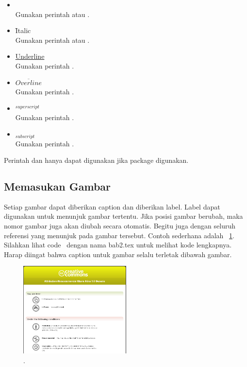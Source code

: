 \begin{itemize}
	\item {} \\
	Gunakan perintah  atau
	.
	\item \f{Italic} \\
	Gunakan perintah  atau
	.
	\item \underline{Underline} \\
	Gunakan perintah .
	\item $\overline{Overline}$ \\
	Gunakan perintah .
	\item $^{superscript}$ \\
	Gunakan perintah \code{\bslash{}$\lbrace\rbrace$}.
	\item $_{subscript}$ \\
	Gunakan perintah \code{\bslash{}\_$\lbrace\rbrace$}.
\end{itemize}

Perintah  dan  hanya dapat digunakan jika
package  digunakan.


\subsection{Memasukan Gambar}
Setiap gambar dapat diberikan caption dan diberikan label. Label dapat
digunakan untuk menunjuk gambar tertentu. Jika posisi gambar berubah, maka
nomor gambar juga akan diubah secara otomatis. Begitu juga dengan seluruh
referensi yang menunjuk pada gambar tersebut. Contoh sederhana adalah
\pic~\ref{fig:testGambar}. Silahkan lihat code \latex~dengan nama bab2.tex
untuk melihat kode lengkapnya. Harap diingat bahwa caption untuk gambar selalu
terletak dibawah gambar.

\begin{figure}
	\centering
	\includegraphics[width=0.50\textwidth]
	{pics/creative_commons.png}
	\caption{\license.}
	\label{fig:testGambar}
\end{figure}


